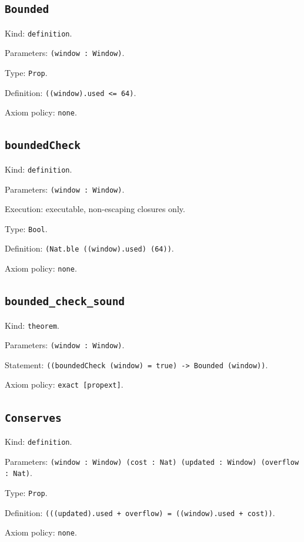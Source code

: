 \documentclass[11pt]{article}
\begin{document}
\subsection*{\texttt{Bounded}}
\noindent Kind: \texttt{definition}.\par
\noindent Parameters: \texttt{(window : Window)}.\par
\noindent Type: \texttt{Prop}.\par
\noindent Definition: \texttt{((window).used <= 64)}.\par
\noindent Axiom policy: \texttt{none}.\par
\subsection*{\texttt{boundedCheck}}
\noindent Kind: \texttt{definition}.\par
\noindent Parameters: \texttt{(window : Window)}.\par
\noindent Execution: executable, non-escaping closures only.\par
\noindent Type: \texttt{Bool}.\par
\noindent Definition: \texttt{(Nat.ble ((window).used) (64))}.\par
\noindent Axiom policy: \texttt{none}.\par
\subsection*{\texttt{bounded\_check\_sound}}
\noindent Kind: \texttt{theorem}.\par
\noindent Parameters: \texttt{(window : Window)}.\par
\noindent Statement: \texttt{((boundedCheck (window) = true) -> Bounded (window))}.\par
\noindent Axiom policy: \texttt{exact [propext]}.\par
\subsection*{\texttt{Conserves}}
\noindent Kind: \texttt{definition}.\par
\noindent Parameters: \texttt{(window : Window) (cost : Nat) (updated : Window) (overflow : Nat)}.\par
\noindent Type: \texttt{Prop}.\par
\noindent Definition: \texttt{(((updated).used + overflow) = ((window).used + cost))}.\par
\noindent Axiom policy: \texttt{none}.\par
\end{document}
